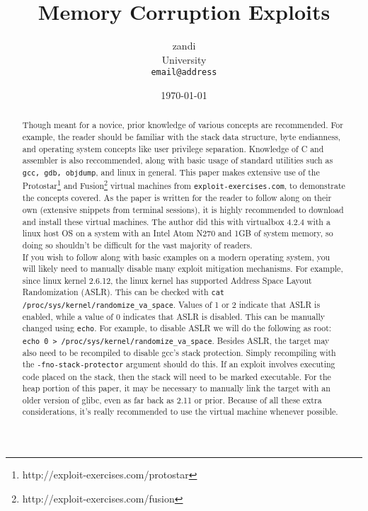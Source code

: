 \documentclass[a4paper]{article}
\begin{document}
\title{Memory Corruption Exploits}
\author{zandi\\
	University\\
	\texttt{email@address}}
\date{\today}
\maketitle

\begin{abstract}
Though meant for a novice, prior knowledge of various concepts are recommended. For example,
the reader should be familiar with the stack data structure, byte endianness, and operating system
concepts like user privilege separation. Knowledge of C and assembler is also reccommended, along
with basic usage of standard utilities such as \texttt{gcc, gdb, objdump}, and linux in general.
This paper makes extensive use of the Protostar\footnote{http://exploit-exercises.com/protostar} and 
Fusion\footnote{http://exploit-exercises.com/fusion} virtual machines from \texttt{exploit-exercises.com},
to demonstrate the concepts covered. As the paper is written for the reader to follow along on their
own (extensive snippets from terminal sessions), it is highly recommended to download and install these
virtual machines. The author did this with virtualbox 4.2.4 with a linux host OS on a system with
an Intel Atom N270 and 1GB of system memory, so doing so shouldn't be difficult for the vast majority
of readers.\\

If you wish to follow along with basic examples on a modern operating system, you will likely
need to manually disable many exploit mitigation mechanisms. For example, since linux kernel
2.6.12, the linux kernel has supported Address Space Layout Randomization (ASLR). This can be
checked with \texttt{cat /proc/sys/kernel/randomize\_va\_space}. Values of 1 or 2 indicate that
ASLR is enabled, while a value of 0 indicates that ASLR is disabled. This can be manually
changed using \texttt{echo}. For example, to disable ASLR we will do the following as root:
\texttt{echo 0 > /proc/sys/kernel/randomize\_va\_space}. Besides ASLR, the target may also need to
be recompiled to disable gcc's stack protection. Simply recompiling with the \texttt{-fno-stack-protector}
argument should do this. If an exploit involves executing code placed on the stack, then
the stack will need to be marked executable. For the heap portion of this paper, it may
be necessary to manually link the target with an older version of glibc, even as far back as
2.11 or prior. Because of all these extra considerations, it's really recommended to use the virtual
machine whenever possible.\\


\end{abstract}
\end{document}
